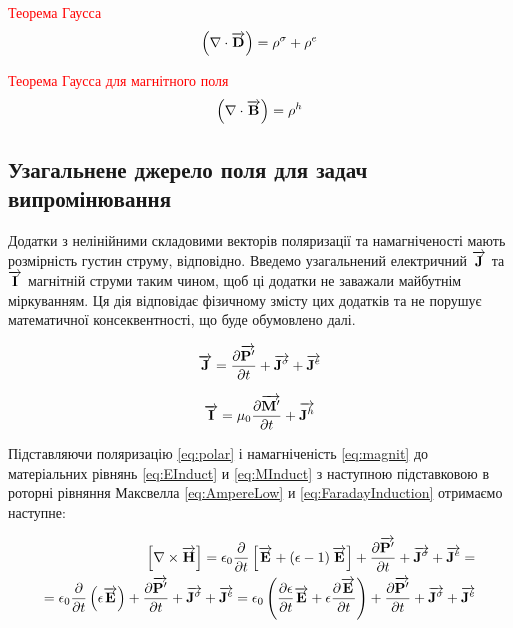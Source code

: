 \textcolor{red}{Теорема Гаусса}
\begin{equation} \label{eq:GaussTheorem}
\left( \nabla \cdot \overrightarrow{\mathbf D} \right) = \rho^\sigma + \rho^e
\end{equation}

\textcolor{red}{Теорема Гаусса для магнітного поля}
\begin{equation} \label{eq:GaussMagnetic}
\left( \nabla \cdot \overrightarrow{\mathbf B} \right) = \rho^h
\end{equation}

\subsection{Узагальнене джерело поля для задач випромінювання}

Додатки з нелінійними складовими векторів поляризації та намагніченості мають
розмірність густин струму, відповідно. Введемо узагальнений електричний 
$ \overrightarrow{\mathbf J} $ та $ \overrightarrow{\mathbf I} $ магнітній струми таким чином, щоб ці додатки 
не заважали майбутнім міркуванням. Ця дія відповідає фізичному змісту цих 
додатків та не порушує математичної консеквентності, що буде обумовлено далі.

\begin{equation*}
\overrightarrow{\mathbf J} = \frac{\partial \overrightarrow{\mathbf P^\prime}}{\partial t} + 
\overrightarrow{\mathbf J^\sigma} + \overrightarrow{\mathbf J^e}
\end{equation*}

\begin{equation*}
\overrightarrow{\mathbf I} = \mu_0 \frac{\partial \overrightarrow{\mathbf M^\prime}}{\partial t} + \overrightarrow{\mathbf J^h}
\end{equation*}

Підставляючи поляризацію \eqref{eq:polar} і намагніченість 
\eqref{eq:magnit} до матеріальних рівнянь \eqref{eq:EInduct} и 
\eqref{eq:MInduct} з наступною підставковою в роторні рівняння Максвелла
\eqref{eq:AmpereLow} и \eqref{eq:FaradayInduction} отримаємо наступне: 

\textcolor{lightgray}{ \begin{equation*} \begin{aligned}
\left[ \nabla \times \overrightarrow{\mathbf H} \right] = \epsilon_0 \frac{\partial }{\partial t} \left[ 
\overrightarrow{\mathbf E} + \left( \epsilon - 1 \right) \overrightarrow{\mathbf E} \right] + 
\frac{\partial \overrightarrow{\mathbf P^\prime}}{\partial t} + \overrightarrow{\mathbf J^\sigma} + \overrightarrow{\mathbf J^e}= \\
= \epsilon_0 \frac{\partial }{\partial t} \left( \epsilon \overrightarrow{\mathbf E} \right) +
\frac{\partial \overrightarrow{\mathbf P^\prime}}{\partial t} + \overrightarrow{\mathbf J^\sigma} + \overrightarrow{\mathbf J^e} = \epsilon_0 \left( \frac{\partial \epsilon}{\partial t} 
\overrightarrow{\mathbf E} + \epsilon \frac{\partial \overrightarrow{\mathbf E}}{\partial t} \right) + 
\frac{\partial \overrightarrow{\mathbf P^\prime}}{\partial t} + \overrightarrow{\mathbf J^\sigma} + \overrightarrow{\mathbf J^e}
\end{aligned} \end{equation*} }

